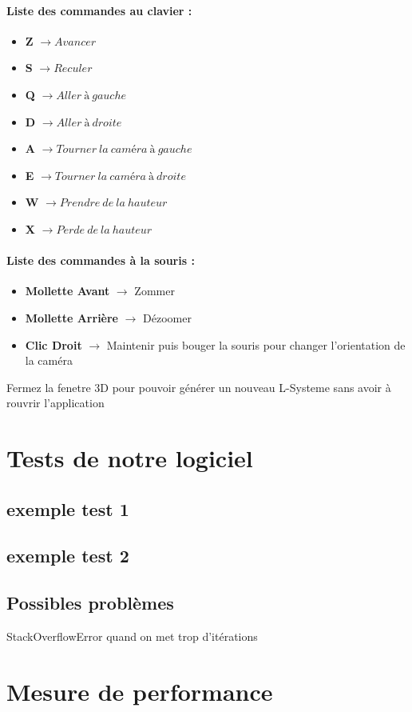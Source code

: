 \paragraph{Liste des commandes au clavier : }
\begin{itemize}
    \item \textbf{Z} $\xrightarrow{} Avancer$
    \item \textbf{S} $\xrightarrow{} Reculer$
    \item \textbf{Q} $\xrightarrow{} Aller \ à \ gauche$
    \item \textbf{D} $\xrightarrow{} Aller \ à \ droite$
    \item \textbf{A} $\xrightarrow{} Tourner \ la \ caméra \ à \ gauche$
    \item \textbf{E} $\xrightarrow{} Tourner \ la \ caméra \ à \ droite$
    \item \textbf{W} $\xrightarrow{} Prendre \ de \ la \ hauteur$
    \item \textbf{X} $\xrightarrow{} Perde \ de \ la \ hauteur$
\end{itemize}
\paragraph{Liste des commandes à la souris :}
\begin{itemize}
    \item \textbf{Mollette Avant} $\xrightarrow{}$ Zommer
    \item \textbf{Mollette Arrière} $\xrightarrow{}$ Dézoomer
    \item \textbf{Clic Droit} $\xrightarrow{}$ Maintenir puis bouger la souris pour changer l'orientation de la caméra

\end{itemize}


Fermez la fenetre 3D pour pouvoir générer un nouveau L-Systeme sans avoir à rouvrir l'application

\section{Tests de notre logiciel}

\subsection{exemple test 1}

\subsection{exemple test 2}

\subsection{Possibles problèmes}

StackOverflowError quand on met trop d'itérations

\section{Mesure de performance}